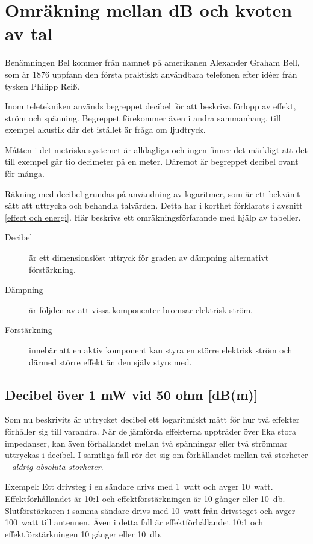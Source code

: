 \chapter{Omräkning mellan dB och kvoten av tal}
\label{decibel}

Benämningen Bel kommer från namnet på amerikanen Alexander Graham
Bell, som år 1876 uppfann den första praktiskt användbara telefonen
efter idéer från tysken Philipp Reiß.

Inom teletekniken används begreppet decibel för att beskriva förlopp
av effekt, ström och spänning. Begreppet förekommer även i andra
sammanhang, till exempel akustik där det istället är fråga om ljudtryck.

Måtten i det metriska systemet är alldagliga och ingen finner det
märkligt att det till exempel går tio decimeter på en meter. Däremot är
begreppet decibel ovant för många.

Räkning med decibel grundas på användning av logaritmer, som är ett
bekvämt sätt att uttrycka och behandla talvärden. Detta har i
korthet förklarats i avsnitt \ref{effect och energi}. Här beskrivs ett
omräkningsförfarande med hjälp av tabeller.

\begin{description}
\item[Decibel] är ett dimensionslöst uttryck för graden av dämpning
  alternativt förstärkning.

\item[Dämpning] är följden av att vissa komponenter bromsar elektrisk
  ström.

\item[Förstärkning] innebär att en aktiv komponent kan styra en större
  elektrisk ström och därmed större effekt än den själv styrs med.
\end{description}

\section{Decibel över 1 mW vid 50 ohm [dB(m)]}

Som nu beskrivits är uttrycket decibel ett logaritmiskt mått för hur
två effekter förhåller sig till varandra. När de jämförda effekterna
uppträder över lika stora impedanser, kan även förhållandet mellan två
spänningar eller två strömmar uttryckas i decibel.
I samtliga fall rör det sig om förhållandet mellan två storheter --
\emph{aldrig absoluta storheter}.

Exempel: Ett drivsteg i en sändare drivs med 1~watt och avger 10~watt.
Effektförhållandet är 10:1 och effektförstärkningen är 10 gånger eller
\SI{10}{\decibel}.
Slutförstärkaren i samma sändare drivs med 10~watt från drivsteget och avger
100~watt till antennen.
Även i detta fall är effektförhållandet 10:1 och effektförstärkningen 10 gånger
eller \SI{10}{\decibel}.

